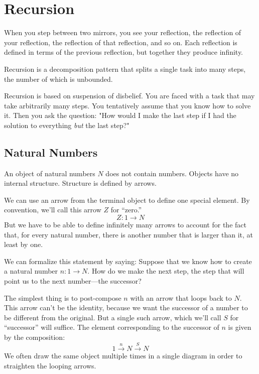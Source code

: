 \documentclass[DaoFP]{subfiles}
\begin{document}
\setcounter{chapter}{6}

\chapter{Recursion}

When you step between two mirrors, you see your reflection, the reflection of your reflection, the reflection of that reflection, and so on. Each reflection is defined in terms of the previous reflection, but together they produce infinity.

Recursion is a decomposition pattern that splits a single task into many steps, the number of which is unbounded.  

Recursion is based on suspension of disbelief. You are faced with a task that may take arbitrarily many steps. You tentatively assume that you know how to solve it. Then you ask the question: "How would I make the last step if I had the solution to everything \emph{but} the last step?"

\section{Natural Numbers}

An object of natural numbers $N$ does not contain numbers. Objects have no internal structure. Structure is defined by arrows. 

We can use an arrow from the terminal object to define one special element. By convention, we'll call this arrow $Z$ for ``zero.''
\[ Z \colon 1 \to N \]
But we have to be able to define infinitely many arrows to account for the fact that, for every natural number, there is another number that is larger than it, at least by one. 

We can formalize this statement by saying: Suppose that we know how to create a natural number $n \colon 1 \to N$. How do we make the next step, the step that will point us to the next number---the successor? 

The simplest thing is to post-compose $n$ with an arrow that loops back to $N$. This arrow can't be the identity, because we want the successor of a number to be different from the original. But a single such arrow, which we'll call $S$  for ``successor'' will suffice. The element corresponding to the successor of $n$ is given by the composition:
\[ 1 \xrightarrow{n} N \xrightarrow{S} N\]
We often draw the same object multiple times in a single diagram in order to straighten the looping arrows.
\end{document}
